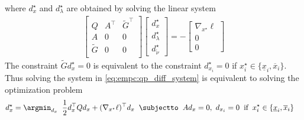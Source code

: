 where $d_x^\star$ and $d_\lambda^\star$ are obtained by solving the linear system
\begin{align}
  \label{eq:empc:qp_diff_system}
  \begin{bmatrix}
    Q & A^\top  & \tilde G^\top  \\
    A & 0 & 0 \\
    \tilde G & 0 & 0 \\
  \end{bmatrix}
  \begin{bmatrix}
    d_x^\star \\ d_\lambda^\star \\ d_{\tilde \nu}^\star
  \end{bmatrix}
  = -
  \begin{bmatrix}
      \nabla_{x^\star} \ell \\ 0 \\ 0
  \end{bmatrix}
\end{align}
The constraint $\tilde G d_x^\star = 0$ is equivalent to
the constraint $d_{x_i}^\star=0$ if
$x_i^\star \in \{\underline{x}_i, \overline{x}_i\}$.
Thus solving the system in \cref{eq:empc:qp_diff_system} is
equivalent to solving the optimization problem
\begin{align}
  \label{eq:empc:box_qp_diff}
  d_x^\star =  \argmin_{d_x} \;\; & \frac{1}{2} d_x^\top  Q d_x + (\nabla_{x^\star} \ell)^\top  d_x \;\;
  \subjectto\;\; A d_x = 0,\
  d_{x_i} = 0\;\; \text{if}\;\; x_i^\star \in\{\underline{x}_i, \overline{x}_i\}
\end{align}


